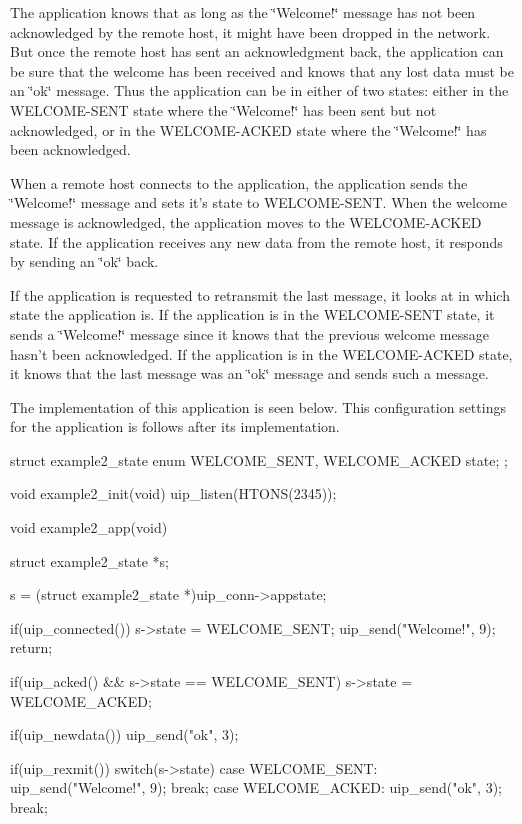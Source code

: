 \-The application knows that as long as the \char`\"{}\-Welcome!\char`\"{} message has not been acknowledged by the remote host, it might have been dropped in the network. \-But once the remote host has sent an acknowledgment back, the application can be sure that the welcome has been received and knows that any lost data must be an \char`\"{}ok\char`\"{} message. \-Thus the application can be in either of two states\-: either in the \-W\-E\-L\-C\-O\-M\-E-\/\-S\-E\-N\-T state where the \char`\"{}\-Welcome!\char`\"{} has been sent but not acknowledged, or in the \-W\-E\-L\-C\-O\-M\-E-\/\-A\-C\-K\-E\-D state where the \char`\"{}\-Welcome!\char`\"{} has been acknowledged.

\-When a remote host connects to the application, the application sends the \char`\"{}\-Welcome!\char`\"{} message and sets it's state to \-W\-E\-L\-C\-O\-M\-E-\/\-S\-E\-N\-T. \-When the welcome message is acknowledged, the application moves to the \-W\-E\-L\-C\-O\-M\-E-\/\-A\-C\-K\-E\-D state. \-If the application receives any new data from the remote host, it responds by sending an \char`\"{}ok\char`\"{} back.

\-If the application is requested to retransmit the last message, it looks at in which state the application is. \-If the application is in the \-W\-E\-L\-C\-O\-M\-E-\/\-S\-E\-N\-T state, it sends a \char`\"{}\-Welcome!\char`\"{} message since it knows that the previous welcome message hasn't been acknowledged. \-If the application is in the \-W\-E\-L\-C\-O\-M\-E-\/\-A\-C\-K\-E\-D state, it knows that the last message was an \char`\"{}ok\char`\"{} message and sends such a message.

\-The implementation of this application is seen below. \-This configuration settings for the application is follows after its implementation.


\begin{DoxyCode}
struct example2_state {
   enum {WELCOME_SENT, WELCOME_ACKED} state;
};

void example2_init(void) {
   uip_listen(HTONS(2345));
}

void example2_app(void) {
   struct example2_state *s;

   s = (struct example2_state *)uip_conn->appstate;
   
   if(uip_connected()) {
      s->state = WELCOME_SENT;
      uip_send("Welcome!\n", 9);
      return;
   } 

   if(uip_acked() && s->state == WELCOME_SENT) {
      s->state = WELCOME_ACKED;
   }

   if(uip_newdata()) {
      uip_send("ok\n", 3);
   }

   if(uip_rexmit()) {
      switch(s->state) {
      case WELCOME_SENT:
         uip_send("Welcome!\n", 9);
         break;
      case WELCOME_ACKED:
         uip_send("ok\n", 3);
         break;
      }
   }
}
\end{DoxyCode}


